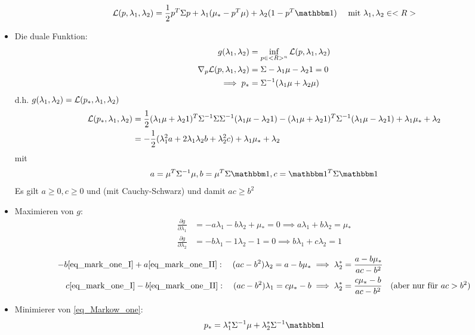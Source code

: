 \begin{itemize}
\begin{align*}
	\LL(p,\lambda_1, \lambda_2) = \half p^T \Sigma p + \lambda_1(\mu_{\ast} - p^T\mu) + \lambda_2(1-p^T \indi) \quad \mit \lambda_1, \lambda_2 \in \R
\end{align*}
	\item Die duale Funktion:
\begin{align*}
	g(\lambda_1, \lambda_2) &= \inf_{p \in <R>^n} \mathcal L(p, \lambda_1, \lambda_2)\\
	\nabla_p \mathcal L(p, \lambda_1, \lambda_2) &= \Sigma - \lambda_1 \mu - \lambda_2 1 = 0\\
	\implies p_{\ast} &= \Sigma^{-1}(\lambda_1 \mu + \lambda_2 \mu)
\end{align*}
d.h. $g(\lambda_1, \lambda_2) = \mathcal L(p_{\ast}, \lambda_1, \lambda_2)$
\begin{align*}
	\mathcal L(p_{\ast}, \lambda_1, \lambda_2) &=
	\frac{1}{2} (\lambda_1 \mu + \lambda_2 1)^T \Sigma^{-1}\Sigma\Sigma^{-1}(\lambda_1\mu - \lambda_2 1) - (\lambda_1 \mu + \lambda_2 1)^T \Sigma^{-1}(\lambda_1 \mu - \lambda_2 1) + \lambda_1 \mu_{\ast} + \lambda_2\\
	&= -\frac{1}{2} (\lambda_1^2 a + 2 \lambda_1 \lambda_2 b + \lambda_2^2 c) + \lambda_1 \mu_{\ast} + \lambda_2
\end{align*}
mit
\begin{align*}
	a = \mu^T \Sigma^{-1}\mu, b = \mu^T\Sigma\indi, c= \indi^T\Sigma\indi
\end{align*}
Es gilt $a \ge 0, c \ge 0$ und (mit Cauchy-Schwarz) und damit $ac \ge b^2$
\item Maximieren von $g$:
	\begin{align*}
		\frac{\partial g}{\partial \lambda_1} &= -a \lambda_1 - b \lambda_2 + \mu_{\ast} = 0 \implies a\lambda_1 + b \lambda_2 = \mu_{\ast} \tag{I}\label{eq_mark_one_I}\\
		\frac{\partial g}{\partial \lambda_2} &= -b \lambda_1 - 1 \lambda_2 - 1 = 0 \implies b\lambda_1 + c \lambda_2 = 1 \tag{II}\label{eq_mark_one_II}
	\end{align*}
	\begin{align*}
		-b\eqref{eq_mark_one_I} + a\eqref{eq_mark_one_II}:\quad (ac - b^2)\lambda_2 = a - b\mu_{\ast} &\implies \lambda^{\ast}_2 = \frac{a - b \mu_{\ast}}{ac - b^2}\\
		c\eqref{eq_mark_one_I} -b\eqref{eq_mark_one_II}:\quad (ac - b^2)\lambda_1 = c\mu_{\ast} - b &\implies \lambda^{\ast}_2 = \frac{c\mu_{\ast} - b }{ac - b^2} \quad (\text{aber nur für } ac > b^2 )
	\end{align*}
\item Minimierer von \eqref{eq_Markow_one}:
\begin{align*}
	p_{\ast} = \lambda_1^{\ast}\Sigma^{-1}\mu + \lambda_2^{\ast}\Sigma^{-1}\indi
\end{align*}
\end{itemize}
